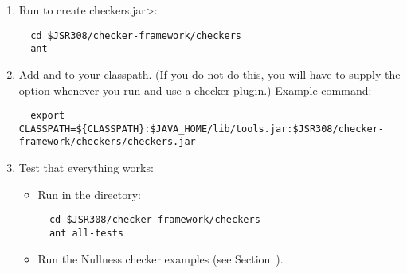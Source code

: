 \begin{enumerate}

\item
Run  to create \<checkers.jar>:

\begin{Verbatim}
  cd $JSR308/checker-framework/checkers
  ant
\end{Verbatim}

\item Add  and  to your classpath.
  (If you do not do this, you will have to supply the  option
  whenever you run  and use a checker plugin.)
  Example command:

\begin{smaller}
\begin{Verbatim}
  export CLASSPATH=${CLASSPATH}:$JAVA_HOME/lib/tools.jar:$JSR308/checker-framework/checkers/checkers.jar
\end{Verbatim}
\end{smaller}

\item Test that everything works:

  \begin{itemize}

  \item Run  in the  directory:
\begin{Verbatim}
  cd $JSR308/checker-framework/checkers
  ant all-tests
\end{Verbatim}

  \item Run the Nullness checker examples (see
    Section~).

  \end{itemize}

\end{enumerate}

